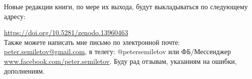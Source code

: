 Новые редакции книги, по мере их выхода, будут выкладываться по следующему адресу:\\ 

\noindent


\href{https://doi.org/10.5281/zenodo.13960463}{https://doi.org/10.5281/zenodo.13960463}\\

Также можете написать мне письмо по электронной почте: \href{peter.semiletov@gmail.com}{peter.semiletov@gmail.com}, 
в телегу: @petersemiletov или ФБ/Мессенджер \href{https://www.facebook.com/peter.semiletov}{www.facebook.com/peter.semiletov}. Буду рад отзывам, указаниям на ошибки, дополнениям.
